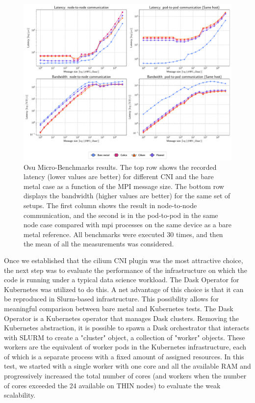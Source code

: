 \begin{figure}
  \centering
  \includegraphics[width=\textwidth]{img/abstract/summary-osu}
  \caption{Osu Micro-Benchmarks results. The top row shows the recorded latency
    (lower values are better) for different CNI and the  bare metal case
    as a function of the MPI message size. The bottom row displays
    the bandwidth (higher values are better) for the same set of setups. The
    first column shows the result in node-to-node communication, and the second
    is in the pod-to-pod in the same node case compared with mpi processes on
    the same device as a bare metal reference. All benchmarks were executed 30
    times, and then the mean of all the measurements was considered.}
  \label{fig:summary-osu_en}
\end{figure}

Once we established that the cilium CNI plugin was the most attractive choice,
the next step was to evaluate the performance of the infrastructure on which the
code is running under a typical data science workload.
The Dask Operator for Kubernetes was utilized to do this.
A net advantage of this choice is that it can be reproduced in Slurm-based
infrastructure.
This possibility allows for meaningful comparison between bare metal and
Kubernetes tests.
The Dask Operator is a Kubernetes operator that manages Dask clusters. Removing
the Kubernetes abstraction, it is possible to spawn a Dask orchestrator that
interacts with SLURM to create a "cluster" object, a collection of "worker"
objects.
These workers are the equivalent of worker pods in the Kubernetes infrastructure, each
of which is a separate process with a fixed amount of assigned resources. In
this test, we started with a single worker with one core and all the available
RAM and progressively increased the total number of cores (and workers when the
number of cores exceeded the 24 available on THIN nodes) to evaluate the weak
scalability.

